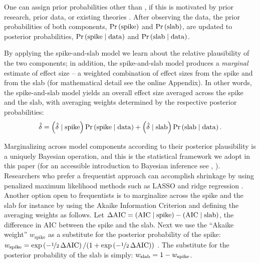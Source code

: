 \documentclass[a4paper]{article}
\newcommand{\shypo}[1]{%
	\ifnum#1>0%
		\mathrm{slab}
	\else%
		\mathrm{spike}
	\fi%
}
\newcommand{\data}{\mathrm{data}}%
\newcommand{\obsDelta}{\hat{\delta}}
\newcommand{\probo}{\mathrm{Pr}}
\newcommand{\prob}[1]{\probo\left(#1\right)}
\newcommand{\AIC}{\mathrm{AIC}}
\newcommand{\DeltaAIC}{\Delta\AIC}
\newenvironment{revision}{\color{black}}{\color{black}}
\begin{document}
\begin{revision}%
One can assign prior probabilities other than , if this is motivated by prior research, prior data, or existing theories \parencite[e.g., ][]{wilson2018prior}.
After observing the data, the prior probabilities of both components, $\prob{\shypo{0}}$ and $\prob{\shypo{1}}$, are updated to posterior probabilities, $\prob{\shypo{0}\mid\data}$ and $\prob{\shypo{1}\mid\data}$.

By applying the spike-and-slab model we learn about the relative plausibility of the two components; in addition, the spike-and-slab model produces a \emph{marginal} estimate of effect size -- a weighted combination of effect sizes from the spike and from the slab (for mathematical detail see the online Appendix). In other words, the spike-and-slab model yields an overall effect size averaged across the spike and the slab, with averaging weights determined by the respective posterior probabilities: 
\begin{align}
\label{eq:modelaverageddelta}
	\obsDelta = \left(\obsDelta\mid\shypo{0}\right)\prob{\shypo{0}\mid\data} + \left(\obsDelta\mid\shypo{1}\right)\prob{\shypo{1}\mid\data}.
\end{align}

Marginalizing across model components according to their posterior plausibility is a uniquely Bayesian operation, and this is the statistical framework we adopt in this paper (for an accessible introduction to Bayesian inference see \citeauthor{VandekerckhoveEtAl2018SI}, \citeyear{VandekerckhoveEtAl2018SI}). Researchers who prefer a frequentist approach can accomplish shrinkage by using penalized maximum likelihood methods such as LASSO and ridge regression \parencite{tibshirani2005sparsity}. Another option open to frequentists is to marginalize across the spike and the slab for instance by using the Akaike Information Criterion \parencite[AIC;][]{Akaike1973} and defining the averaging weights as follows. Let $\DeltaAIC = \left(\AIC\mid\shypo{0}\right) - \left(\AIC\mid\shypo{1}\right)$, the difference in AIC between the spike and the slab. Next we use the ``Akaike weight'' $w_{\text{spike}}$ as a substitute for the posterior probability of the spike: 
$w_{\shypo{0}} = \exp\left(-\nicefrac{1}{2}\,\DeltaAIC\right) / (1 + \exp\left(-\nicefrac{1}{2}\,\DeltaAIC\right))$ 
\parencite{WagenmakersFarrell2004, BurnhamAnderson2002}. The substitute for the posterior probability of the slab is simply: $w_{\shypo{1}} = 1 - w_{\shypo{0}}$.


\end{revision}
\end{document}
